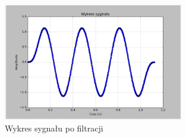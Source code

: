 \documentclass{article}
\begin{document}
{{            \begin{figure}[h!]
                \centering
                \includegraphics[width=0.7\textwidth]{img/fil4.png}
                \caption{Wykres sygnału po filtracji}
            \end{figure}
            \FloatBarrier
        }
        \newpage

}
\end{document}
